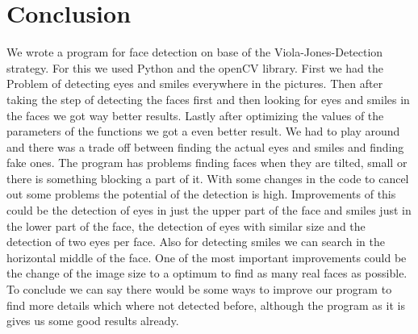 \documentclass[11pt, a4paper, twocolumn]{article}
\begin{document}
\section*{Conclusion}
We wrote a program for face detection on base of the Viola-Jones-Detection strategy. For this we used Python and the openCV library. First we had the Problem of detecting eyes and smiles everywhere in the pictures. Then after taking the step of detecting the faces first and then looking for eyes and smiles in the faces we got way better results. Lastly after optimizing the values of the parameters of the functions we got a even better result. We had to play around and there was a trade off between finding the actual eyes and smiles and finding fake ones. The program has problems finding faces when they are tilted, small or there is something blocking a part of it. With some changes in the code to cancel out some problems the potential of the detection is high. Improvements of this could be the detection of eyes in just the upper part of the face and smiles just in the lower part of the face, the detection of eyes with similar size and the detection of two eyes per face. Also for detecting smiles we can search in the horizontal middle of the face. One of the most important improvements could be the change of the image size to a optimum to find as many real faces as possible. To conclude we can say there would be some ways to improve our program to find more details which where not detected before, although the program as it is gives us some good results already.


{}

%
\end{document}
